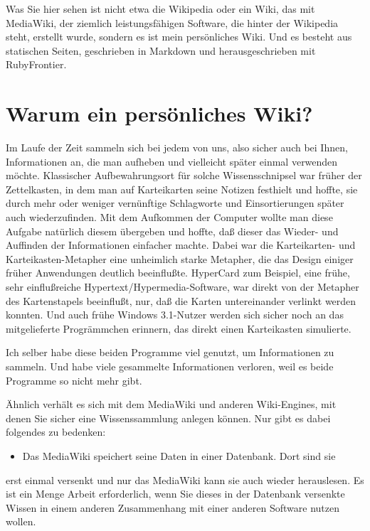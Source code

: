 \documentclass[11pt]{report}
\begin{document}
Was Sie hier sehen ist nicht etwa die Wikipedia oder ein Wiki, das mit
MediaWiki, der ziemlich leistungsfähigen Software, die hinter der
Wikipedia steht, erstellt wurde, sondern es ist mein persönliches
Wiki. Und es besteht aus statischen Seiten, geschrieben in Markdown
und herausgeschrieben mit RubyFrontier.
\section{Warum ein persönliches Wiki?}
\label{sec-2-10-1}


Im Laufe der Zeit sammeln sich bei jedem von uns, also sicher auch bei
Ihnen, Informationen an, die man aufheben und vielleicht später einmal
verwenden möchte. Klassischer Aufbewahrungsort für solche
Wissensschnipsel war früher der Zettelkasten, in dem man auf
Karteikarten seine Notizen festhielt und hoffte, sie durch mehr oder
weniger vernünftige Schlagworte und Einsortierungen später auch
wiederzufinden. Mit dem Aufkommen der Computer wollte man diese
Aufgabe natürlich diesem übergeben und hoffte, daß dieser das Wieder-
und Auffinden der Informationen einfacher machte. Dabei war die
Karteikarten- und Karteikasten-Metapher eine unheimlich starke
Metapher, die das Design einiger früher Anwendungen deutlich
beeinflußte. HyperCard zum Beispiel, eine frühe, sehr einflußreiche
Hypertext/Hypermedia-Software, war direkt von der Metapher des
Kartenstapels beeinflußt, nur, daß die Karten untereinander verlinkt
werden konnten. Und auch frühe Windows 3.1-Nutzer werden sich sicher
noch an das mitgelieferte Progrämmchen erinnern, das direkt einen
Karteikasten simulierte.


Ich selber habe diese beiden Programme viel genutzt, um Informationen
zu sammeln. Und habe viele gesammelte Informationen verloren, weil es
beide Programme so nicht mehr gibt.


Ähnlich verhält es sich mit dem MediaWiki und anderen Wiki-Engines,
mit denen Sie sicher eine Wissenssammlung anlegen können. Nur gibt es
dabei folgendes zu bedenken:

\begin{itemize}
\item Das MediaWiki speichert seine Daten in einer Datenbank. Dort sind sie
\end{itemize}
erst einmal versenkt und nur das MediaWiki kann sie auch wieder
herauslesen. Es ist ein Menge Arbeit erforderlich, wenn Sie dieses in
der Datenbank versenkte Wissen in einem anderen Zusammenhang mit einer
anderen Software nutzen wollen.
\end{document}
